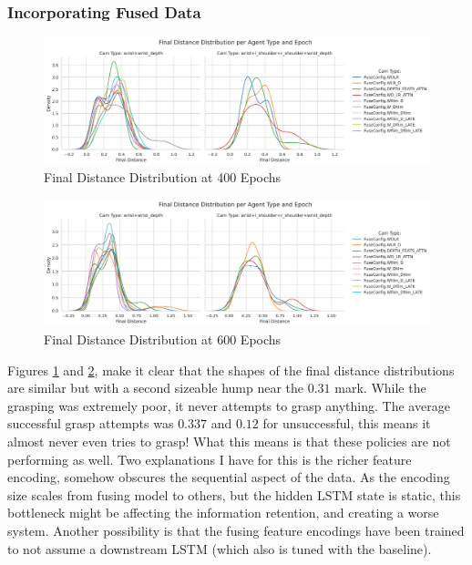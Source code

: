 \subsubsection{Incorporating Fused Data}

\begin{figure}[htpb]
  \centering
  \includegraphics[width=0.8\linewidth]{assets/evaluation/rnn/400-cams.png}
  \caption{Final Distance Distribution at 400 Epochs}\label{fig:rnn-fusing-400}
\end{figure}

\begin{figure}[htpb]
  \centering
  \includegraphics[width=0.8\linewidth]{assets/evaluation/rnn/600-cams.png}
  \caption{Final Distance Distribution at 600 Epochs}\label{fig:rnn-fusing-600}
\end{figure}

Figures \ref{fig:rnn-fusing-400} and \ref{fig:rnn-fusing-600}, make it clear that the shapes of the final distance distributions are similar but with a second sizeable hump near the $0.31$ mark. While the grasping was extremely poor, it never attempts to grasp anything. The average successful grasp attempts was $0.337$ and $0.12$ for unsuccessful, this means it almost never even tries to grasp! What this means is that these policies are not performing as well. Two explanations I have for this is the richer feature encoding, somehow obscures the sequential aspect of the data. As the encoding size scales from fusing model to others, but the hidden LSTM state is static, this bottleneck might be affecting the information retention, and creating a worse system. Another possibility is that the fusing feature encodings have been trained to not assume a downstream LSTM (which also is tuned with the baseline).

